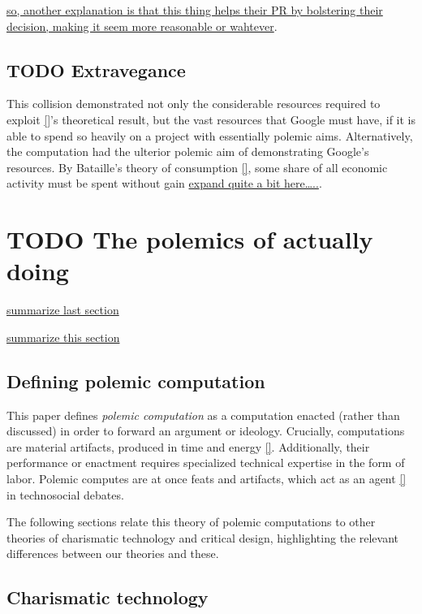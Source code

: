 \documentclass[sigconf]{acmart}
\begin{document}
\uline{so, another explanation is that this thing helps their PR by bolstering their decision, making it seem more reasonable or wahtever}.

\subsection{{\bfseries\sffamily TODO} Extravegance}
\label{sec:orgd2747f4}

This collision demonstrated not only the considerable resources required to exploit \uline{[]}'s theoretical result,
but the vast resources that Google must have, if it is able to spend so heavily on a project with essentially polemic aims.
Alternatively, the computation had the ulterior polemic aim of demonstrating Google's resources.
By Bataille's theory of consumption \uline{[]}, some share of all economic activity must be spent without gain \uline{expand quite a bit here\ldots{}..}.


\section{{\bfseries\sffamily TODO} The polemics of actually doing}
\label{sec:org945dce5}

\uline{summarize last section}

\uline{summarize this section}

\subsection{Defining polemic computation}
\label{sec:org68abbfd}

This paper defines \emph{polemic computation} 
as a computation enacted (rather than discussed)
in order to forward an argument or ideology.
Crucially, computations are material artifacts, 
produced in time and energy \uline{[]}.
Additionally,
their performance or enactment requires 
specialized technical expertise in the form of labor.
Polemic computes are at once feats and artifacts, which act
as an agent \uline{[]} in technosocial debates.

The following sections relate this theory of polemic computations
to other theories of charismatic technology and critical design,
highlighting the relevant differences between our theories and these. 

\subsection{Charismatic technology}
\label{sec:org23a861e}
\end{document}
